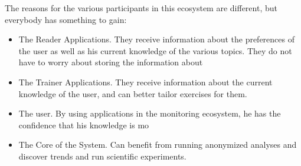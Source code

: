 The reasons for the various participants in this ecosystem are different, but everybody has something to gain: 

\begin{itemize}
	\item The Reader Applications. They receive information about the preferences of the user as well as his current knowledge of the various topics. They do not have to worry about storing the information about 

	\item The Trainer Applications. They receive information about the current knowledge of the user, and can better tailor exercises for them.
	
	\item The user. By using applications in the monitoring ecosystem, he has the confidence that his knowledge is mo

	\item The Core of the System. Can benefit from running anonymized analyses and discover trends and run scientific experiments.
\end{itemize}


